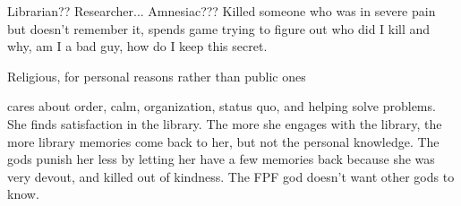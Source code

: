 \documentclass[char]{GL2020}
\begin{document}
\name{\cLibrarian{}}








Librarian??  Researcher... Amnesiac???  Killed someone who was in severe pain but doesn't remember it, spends game trying to figure out who did I kill and why, am I a bad guy, how do I keep this secret.

Religious, for personal reasons rather than public ones

\cLibrarian{} cares about order, calm, organization, status quo, and helping solve problems.  She finds satisfaction in the library.  The more she engages with the library, the more library memories come back to her, but not the personal knowledge.  The gods punish her less by letting her have a few memories back because she was very devout, and killed out of kindness.  The FPF god doesn't want other gods to know.
\end{document}
